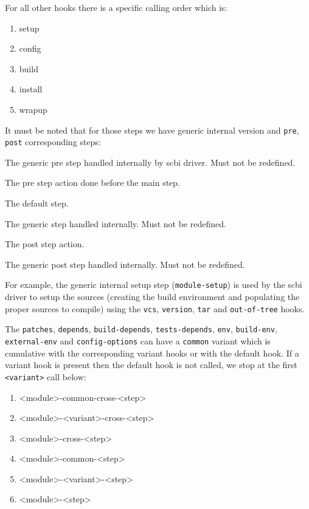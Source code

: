 \documentclass[a4paper,12pt,twoside]{article}
\newcommand{\code}[1]{\texttt{#1}}
\begin{document}
For all other hooks there is a specific calling order which is:

\begin{enumerate}
	\item setup
	\item config
	\item build
	\item install
	\item wrapup
\end{enumerate}

It must be noted that for those steps we have generic internal version and \code{pre}, \code{post} corresponding steps:

\begin{description}[font=\texttt,style=nextline]
	\item[module-pre-<step>] The generic pre step handled internally by scbi driver. Must not be redefined.
	\item[<module>-pre-<step>] The pre step action done before the main step.
	\item[<module>-<step>] The default step.
	\item[module-<step>] The generic step handled internally. Must not be redefined.
	\item[<module>-post-<step>] The post step action.
	\item[module-post-<step>] The generic post step handled internally. Must not be redefined.
\end{description}

For example, the generic internal setup step (\code{module-setup}) is used by the scbi driver to setup the sources (creating the build environment and populating the proper sources to compile) using the \code{vcs}, \code{version}, \code{tar} and \code{out-of-tree} hooks.

The \code{patches}, \code{depends}, \code{build-depends}, \code{tests-depends}, \code{env}, \code{build-env}, \code{external-env} and \code{config-options} can have a \code{common} variant which is cumulative with the corresponding variant hooks or with the default hook. If a variant hook is present then the default hook is not called, we stop at the first \code{<variant>} call below:

\begin{enumerate}
	\item <module>-common-cross-<step>
	\item <module>-<variant>-cross-<step>
	\item <module>-cross-<step>
	\item <module>-common-<step>
	\item <module>-<variant>-<step>
	\item <module>-<step>
\end{enumerate}
\end{document}
